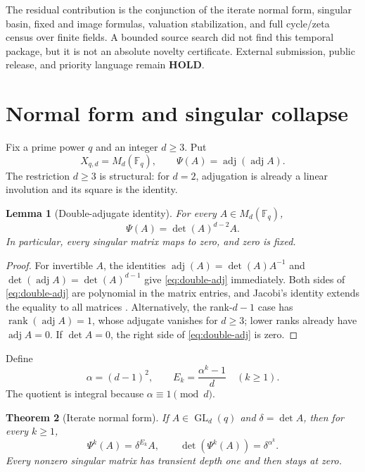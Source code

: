 \documentclass[11pt,a4paper]{amsart}
\newtheorem{theorem}{Theorem}[section]
\newtheorem{lemma}[theorem]{Lemma}
\theoremstyle{definition}
\theoremstyle{remark}
\newcommand{\F}{\mathbb F}
\newcommand{\GL}{\operatorname{GL}}
\newcommand{\adj}{\operatorname{adj}}
\begin{document}
The residual contribution is the conjunction of the iterate normal form,
singular basin, fixed and image formulas, valuation stabilization, and full
cycle/zeta census over finite fields.  A bounded source search did not find
this temporal package, but it is not an absolute novelty certificate.
External submission, public release, and priority language remain
\textbf{HOLD}.

\section{Normal form and singular collapse}

Fix a prime power $q$ and an integer $d\ge3$.  Put
\[
 X_{q,d}=M_d(\F_q),\qquad \Psi(A)=\adj(\adj A).
\]
The restriction $d\ge3$ is structural: for $d=2$, adjugation is already a
linear involution and its square is the identity.

\begin{lemma}[Double-adjugate identity]\label{lem:jacobi}
For every $A\in M_d(\F_q)$,
\begin{equation}\label{eq:double-adj}
 \Psi(A)=\det(A)^{d-2}A.
\end{equation}
In particular, every singular matrix maps to zero, and zero is fixed.
\end{lemma}

\begin{proof}
For invertible $A$, the identities
$\adj(A)=\det(A)A^{-1}$ and
$\det(\adj A)=\det(A)^{d-1}$ give \eqref{eq:double-adj} immediately.
Both sides of \eqref{eq:double-adj} are polynomial in the matrix entries,
and Jacobi's identity extends the equality to all matrices
\cite{Lawrence1964}.  Alternatively, the rank-$d-1$ case has
$\operatorname{rank}(\adj A)=1$, whose adjugate vanishes for $d\ge3$;
lower ranks already have $\adj A=0$.  If $\det A=0$, the right side of
\eqref{eq:double-adj} is zero.
\end{proof}

Define
\begin{equation}\label{eq:alpha-E}
 \alpha=(d-1)^2,\qquad E_k=\frac{\alpha^k-1}{d}\quad(k\ge1).
\end{equation}
The quotient is integral because $\alpha\equiv1\pmod d$.

\begin{theorem}[Iterate normal form]\label{thm:iterate}
If $A\in\GL_d(q)$ and $\delta=\det A$, then for every $k\ge1$,
\begin{equation}\label{eq:iterate}
 \boxed{\Psi^k(A)=\delta^{E_k}A},
 \qquad
 \det(\Psi^k(A))=\delta^{\alpha^k}.
\end{equation}
Every nonzero singular matrix has transient depth one and then stays at
zero.
\end{theorem}
\end{document}
